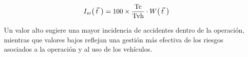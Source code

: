 \begin{equation*}
    I_{si}\big( \hspace{0.07cm} \smash{\vec{t}}\,\vphantom{t} \hspace{0.07cm} \big) = 100 \times \frac{\text{Tc}}{\text{Tvh}}  \cdot W\big( \hspace{0.07cm} \smash{\vec{t}}\,\vphantom{t} \hspace{0.07cm} \big)
\end{equation*}


Un valor alto sugiere una mayor incidencia de accidentes dentro de la operación, mientras que valores bajos reflejan una gestión más efectiva de los riesgos asociados a la operación y al uso de los vehículos.

